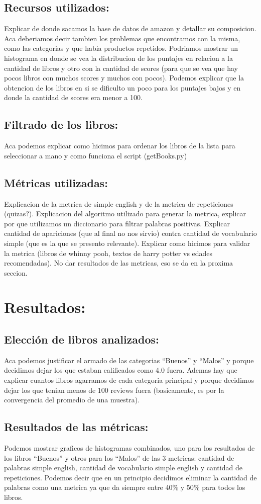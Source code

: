 \documentclass[12pt,journal,compsoc]{IEEEtran}
\begin{document}
\subsection{Recursos utilizados:}
 Explicar de donde sacamos la base de datos de amazon y detallar su composicion. Aca deberiamos decir tambien los problemas que encontramos con la misma, como las categorias y que habia productos repetidos. Podriamos mostrar un histograma en donde se vea la distribucion de los puntajes en relacion a la cantidad de libros y otro con la cantidad de scores (para que se vea que hay pocos libros con muchos scores y muchos con pocos). Podemos explicar que la obtencion de los libros en si se dificulto un poco para los puntajes bajos y en donde la cantidad de scores era menor a 100.
\subsection{Filtrado de los libros:} Aca podemos explicar como hicimos para ordenar los libros de la lista para seleccionar a mano y como funciona el script (getBooks.py)
\subsection{Métricas utilizadas:} Explicacion de la metrica de simple english y de la metrica de repeticiones (quizas?). Explicacion del algoritmo utilizado para generar la metrica, explicar por que utilizamos un diccionario para filtrar palabras positivas. Explicar cantidad de apariciones (que al final no nos sirvio) contra cantidad de vocabulario simple (que es la que se presento relevante). Explicar como hicimos para validar la metrica (libros de whinny pooh, textos de harry potter vs edades recomendadas). No dar resultados de las metricas, eso se da en la proxima seccion.

\section{Resultados:}
\subsection{Elección de libros analizados:} Aca podemos justificar el armado de las categorias ``Buenos'' y ``Malos'' y porque decidimos dejar los que estaban calificados como 4.0 fuera. Ademas hay que explicar cuantos libros agarramos de cada categoria principal y porque decidimos dejar los que tenian menos de 100 reviews fuera (basicamente, es por la convergencia del promedio de una muestra). \subsection{Resultados de las métricas:} Podemos mostrar graficos de histogramas combinados, uno para los resultados de los libros ``Buenos'' y otros para los ``Malos'' de las 3 metricas: cantidad de palabras simple english, cantidad de vocabulario simple english y cantidad de repeticiones. Podemos decir que en un principio decidimos eliminar la cantidad de palabras como una metrica ya que da siempre entre 40\% y 50\% para todos los libros.\\
\end{document}
